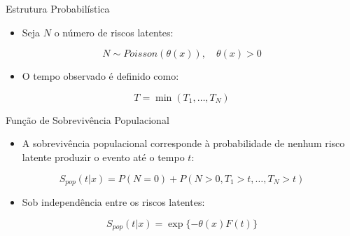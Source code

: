 \documentclass[aspectratio=169,t,xcolor=table]{beamer}
\begin{document}
\begin{frame}{Estrutura Probabilística}

\begin{itemize}
\item Seja $N$ o número de riscos latentes:
\end{itemize}

\[
N \sim Poisson(\theta(x)), \quad \theta(x)>0
\]

\vspace{0.4cm}



\vspace{0.4cm}

\begin{itemize}
\item O tempo observado é definido como:
\end{itemize}

\[
T=\min(T_1,\ldots,T_N)
\]

\end{frame}

\begin{frame}{Função de Sobrevivência Populacional}

\begin{itemize}
\item A sobrevivência populacional corresponde à probabilidade de nenhum risco latente produzir o evento até o tempo $t$:
\end{itemize}

\[
S_{pop}(t|x)=P(N=0)+P(N>0,T_1>t,\ldots,T_N>t)
\]

\vspace{0.4cm}

\begin{itemize}
\item Sob independência entre os riscos latentes:
\end{itemize}

\[
S_{pop}(t|x)=\exp\{-\theta(x)F(t)\}
\]

\end{frame}
\end{document}
